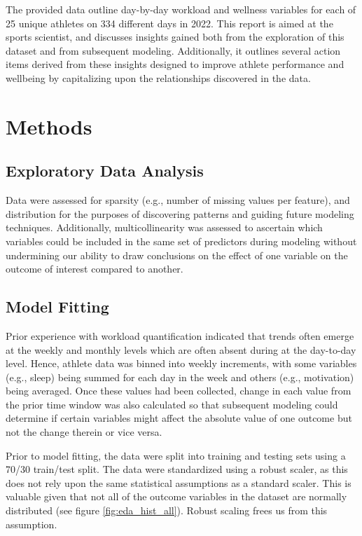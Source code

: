 \documentclass{article}
\begin{document}
		The provided data outline day-by-day workload and wellness
		variables for each of 25 unique athletes on 334 different
		days in 2022. This report is aimed at the sports scientist,
		and discusses insights gained both from the exploration of
		this dataset and from subsequent modeling. Additionally,
		it outlines several action items derived from these insights
		designed to improve athlete performance and wellbeing by
		capitalizing upon the relationships discovered in the data.

	\section{Methods}

		\subsection{Exploratory Data Analysis}

			Data were assessed for sparsity (e.g., number of
			missing values per feature), and distribution for
			the purposes of discovering patterns and guiding future
			modeling techniques. Additionally, multicollinearity
			was assessed to ascertain which variables could be
			included in the same set of predictors during modeling
			without undermining our ability to draw conclusions on
			the effect of one variable on the outcome of interest
			compared to another.

		\subsection{Model Fitting}

			Prior experience with workload quantification indicated
			that trends often emerge at the weekly and monthly levels
			which are often absent during at the day-to-day level.
			Hence, athlete data was binned into weekly increments,
			with some variables (e.g., sleep) being summed for each
			day in the week and others (e.g., motivation) being averaged.
			Once these values had been collected, change in each value
			from the prior time window was also calculated so that
			subsequent modeling could determine if certain variables
			might affect the absolute value of one outcome but not
			the change therein or vice versa.

			Prior to model fitting, the data were split into training
			and testing sets using a 70/30 train/test split. The
			data were standardized using a robust scaler, as this does
			not rely upon the same statistical assumptions as a standard
			scaler. This is valuable given that not all of the outcome variables
			in the dataset are normally distributed
			(see figure \ref{fig:eda_hist_all}). Robust scaling frees
			us from this assumption.
\end{document}
